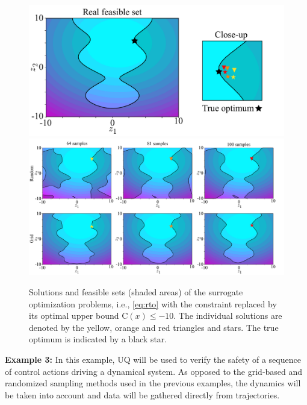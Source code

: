 \begin{figure}[t]
	\centering
	\includegraphics[scale=0.25]{../images/chap2_numex_ex2_gt.pdf} \\
	\includegraphics[scale=0.25]{../images/chap2_numex_ex2_res.pdf}
	\caption{Solutions and feasible sets (shaded areas) of the surrogate optimization problems, i.e., \eqref{eq:rto} with the constraint replaced by its optimal upper bound C$(x) \leq -10$. The individual solutions are denoted by the yellow, orange and red triangles and stars. The true optimum is indicated by a black star.}
	\label{fig:constraints}
\end{figure}

\textbf{Example 3:} In this example, UQ will be used to verify the safety of a sequence of control actions driving a dynamical system. As opposed to the grid-based and randomized sampling methods used in the previous examples, the dynamics will be taken into account and data will be gathered directly from trajectories.

